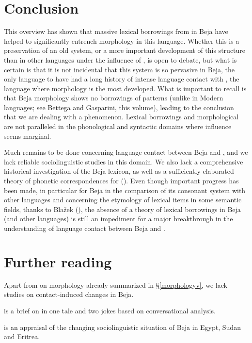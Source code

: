 \documentclass[output=paper]{langsci/langscibook}
\begin{document}
\section{Conclusion}

This overview has shown that massive lexical borrowings from  in Beja have helped to significantly entrench  morphology in this language. Whether this is a preservation of an old  system, or a more important development of this structure than in other  languages under the influence of , is open to debate, but what is certain is that it is not incidental that this system is so pervasive in Beja, the only  language to have had a long history of intense language contact with , the  language where  morphology is the most developed. What is important to recall is that Beja  morphology shows no borrowings of  patterns (unlike in Modern  languages; see Bettega and Gasparini, this volume), leading to the conclusion that we are dealing with a  phenomenon. Lexical borrowings and morphological  are not paralleled in the phonological and syntactic domains where  influence seems marginal.

Much remains to be done concerning language contact between Beja and , and we lack reliable sociolinguistic studies in this domain. We also lack a comprehensive historical investigation of the Beja lexicon, as well as a sufficiently elaborated theory of phonetic correspondences for  (\citealt[267]{Cohen1988}). Even though important progress has been made, in particular for Beja in the comparison of its consonant system with other  languages and concerning the etymology of lexical items in some semantic fields, thanks to Blažek (\citeyear{Blažek2000,Blažek2003kinship,Blažek2003fauna,Blažek2006BB2,Blažek2006BB3}), the absence of a theory of lexical borrowings in Beja (and other  languages) is still an impediment for a major breakthrough in the understanding of language contact between Beja and .

\section*{Further reading}
\begin{furtherreading}
\item Apart from \citet{Vanhove2012} on  morphology already summarized in §\ref{morphologyv}, we lack studies on contact-induced changes in Beja. 
\item \citet{Vanhove2003} is a brief  on  in one tale and two jokes based on conversational analysis. 
\item \citet{Wedekind2012} is an appraisal of the changing sociolinguistic situation of Beja in Egypt, Sudan and Eritrea.
\end{furtherreading}
\end{document}
